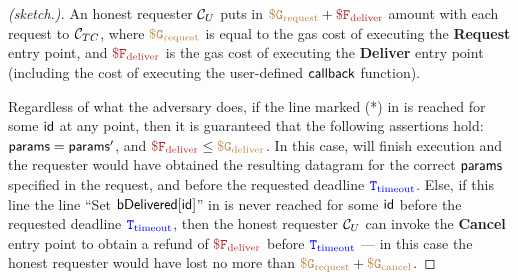 \begin{proof}[(sketch.)]
An honest requester ${\cal C}_U$  
puts in 
$\sbrown{\$ G_{\text{request}}} + \smaroon{\$ F_{\text{deliver}}}$
amount with each request to ${\cal C}_{TC}$,
where $\tt {\color{brown} \$ G_{\text{request}} }$
is equal to the gas cost of executing the
{\bf Request} entry point,
and $\smaroon{\$ F_{\text{deliver}}}$ is the gas cost
of executing the {\bf Deliver} entry point (including
the cost of executing the user-defined ${\sf callback}$ function).

Regardless of what the adversary does,  
if the line marked (*) %
in \tcont
is reached for some ${\sf id}$ at any point,
then it is guaranteed that the following assertions
hold:
${\sf params} = {\sf params}'$,
and $\smaroon{\$ F_{\text{deliver}}} \leq 
\sbrown{\$ G_{\text{deliver}}}$.
In this case, \tcont will finish execution and the requester
would have obtained the resulting 
datagram for the correct ${\sf params}$ specified in the request,
and before the requested deadline ${\color{blue} {{\tt T}}_{\text{timeout}}}$.
Else, if this line 
the line ``Set ${\sf bDelivered[{\sf id}]}$''
in \tcont
is never reached for some ${\sf id}$ before the requested deadline 
${\color{blue} {{\tt T}}_{\text{timeout}}}$, then 
the honest requester ${\cal C}_U$ can invoke the {\bf Cancel}
entry point to obtain a refund 
of $\smaroon{\$F_{\text{deliver}}}$ before ${\color{blue} {{\tt T}}_{\text{timeout}}}$ ---
in this case the honest requester would have lost
no more than $\tt {\color{brown} \$ G_{\text{request}} } + \tt {\color{brown} \$ G_{\text{cancel}} }$.
\end{proof}



